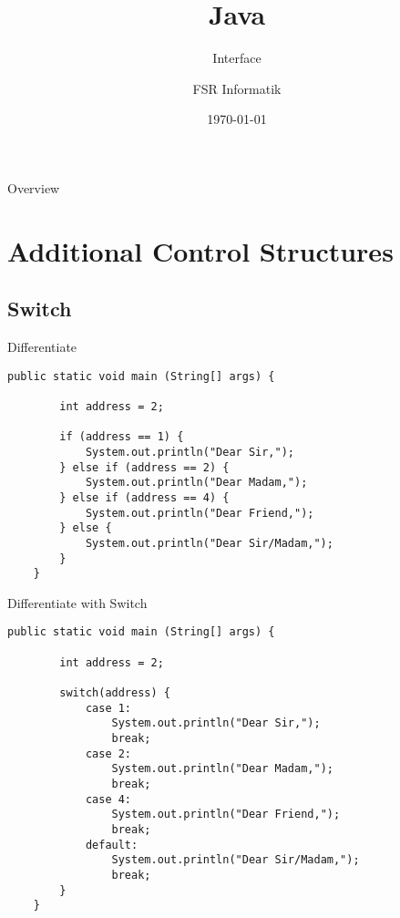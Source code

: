 

\title{Java}
\subtitle{Interface}
\author{FSR Informatik}
\date{\today}



\begin{frame}
\titlepage
\end{frame}
\begin{frame}{Overview}
\tableofcontents
\end{frame}

\section{Additional Control Structures}
\subsection{Switch}
\begin{frame}[fragile]{Differentiate}
	\begin{lstlisting}[basicstyle=\ttfamily\scriptsize]
	public static void main (String[] args) {
	
	    int address = 2;
	    	
	    if (address == 1) {
	        System.out.println("Dear Sir,");	    
	    } else if (address == 2) {
	        System.out.println("Dear Madam,");		    
	    } else if (address == 4) {
	        System.out.println("Dear Friend,");		    
	    } else {
	        System.out.println("Dear Sir/Madam,");	
	    }
	}
	\end{lstlisting}
\end{frame}
\begin{frame}[fragile]{Differentiate with Switch}
	\begin{lstlisting}[basicstyle=\ttfamily\scriptsize]
	public static void main (String[] args) {
	
	    int address = 2;
	    
	    switch(address) {
	        case 1:
	            System.out.println("Dear Sir,");
	            break;
	        case 2:
	            System.out.println("Dear Madam,");
	            break;
	        case 4:
	            System.out.println("Dear Friend,");
	            break; 
	        default:
	            System.out.println("Dear Sir/Madam,");
	            break;
	    }
	}
	\end{lstlisting}
\end{frame}
